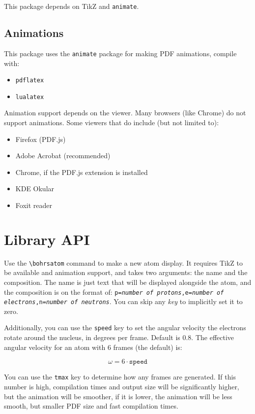 \documentclass[
	a4paper,
	10pt,
]{article}
\begin{document}
This package depends on TikZ and \texttt{animate}.

\subsection{Animations}

This package uses the \texttt{animate} package for making PDF animations, compile with:

\begin{itemize}
	\item \texttt{pdflatex}
	\item \texttt{lualatex}
\end{itemize}

Animation support depends on the viewer. Many browsers (like Chrome) do not support animations. Some viewers that do include (but not limited to):

\begin{itemize}
	\item Firefox (PDF.js)
	\item Adobe Acrobat (recommended)
	\item Chrome, if the PDF.js extension is installed
	\item KDE Okular
	\item Foxit reader
\end{itemize}

\section{Library API}

Use the \texttt{\textbackslash bohrsatom} command to make a new atom display. It requires TikZ to be available and animation support, and takes two arguments: the name and the composition. The name is just text that will be displayed alongside the atom, and the composition is on the format of: \texttt{p=\textit{number of protons},e=\textit{number of electrons},n=\textit{number of neutrons}}. You can skip any \textit{key} to implicitly set it to zero.

Additionally, you can use the \texttt{speed} key to set the angular velocity the electrons rotate around the nucleus, in degrees per frame. Default is $0.8$. The effective angular velocity for an atom with $6$ frames (the default) is:

\[
	\omega = 6 \cdot \texttt{speed}
\]

You can use the \texttt{tmax} key to determine how any frames are generated. If this number is high, compilation times and output size will be significantly higher, but the animation will be smoother, if it is lower, the animation will be less smooth, but smaller PDF size and fast compilation times.
\end{document}
